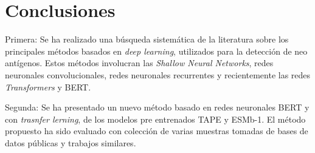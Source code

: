 \chapter{Conclusiones}
\label{cap:conclusiones}



Primera: Se ha realizado una búsqueda sistemática de la literatura sobre los principales métodos basados en \textit{deep learning}, utilizados para la detección de neo antígenos. Estos métodos involucran las \textit{Shallow Neural Networks}, redes neuronales convolucionales, redes neuronales recurrentes y recientemente las redes \textit{Transformers} y BERT.


Segunda: Se ha presentado un nuevo método basado en redes neuronales BERT y con \textit{trasnfer lerning}, de los modelos pre entrenados TAPE y ESMb-1. El método propuesto ha sido evaluado con colección de varias muestras tomadas de bases de datos públicas y trabajos similares.



